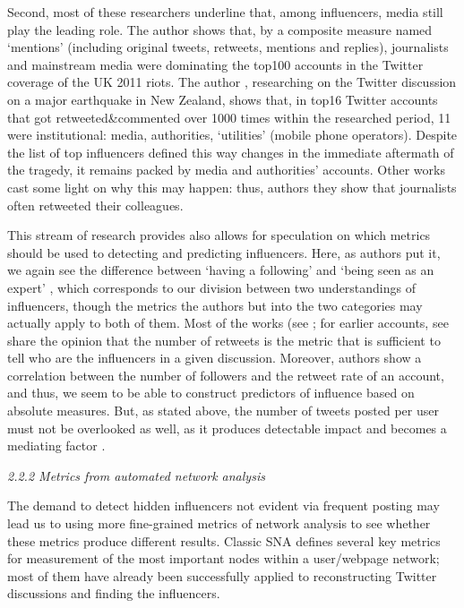 Second, most of these researchers underline that, among influencers, media still play the leading role. The author \cite{Vis} shows that, by a composite measure named ‘mentions’ (including original tweets, retweets, mentions and replies), journalists and mainstream media were dominating the top100 accounts in the Twitter coverage of the UK 2011 riots. The author \cite{Bruns}, researching on the Twitter discussion on a major earthquake in New Zealand, shows that, in top16 Twitter accounts that got retweeted\&commented over 1000 times within the researched period, 11 were institutional: media, authorities, ‘utilities’ (mobile phone operators). Despite the list of top influencers defined this way changes in the immediate aftermath of the tragedy, it remains packed by media and authorities’ accounts. Other works cast some light on why this may happen: thus, authors \cite{LotanGraeffAnanny} they show that journalists often retweeted their colleagues.

This stream of research provides also allows for speculation on which metrics should be used to detecting and predicting influencers. Here, as authors \cite{DuboisGaffney} put it, we again see the difference between ‘having a following’ and ‘being seen as an expert’ \cite[p.~1263]{DuboisGaffney}, which corresponds to our division between two understandings of influencers, though the metrics the authors but into the two categories may actually apply to both of them. Most of the works (see \cite{BastosRaimundoTravitzki}; for earlier accounts, see \cite{KwakLeePark,BoydGolderLotan,ChaHaddadiBenevenuto,MendozaPobleteCastillo,SuhHongChi} share the opinion that the number of retweets is the metric that is sufficient to tell who are the influencers in a given discussion. Moreover, authors \cite{SuhHongChi} show a correlation between the number of followers and the retweet rate of an account, and thus, we seem to be able to construct predictors of influence based on absolute measures. But, as stated above, the number of tweets posted per user must not be overlooked as well, as it produces detectable impact and becomes a mediating factor \cite{Jungherr}.

\textit{2.2.2 Metrics from automated network analysis}

The demand to detect hidden influencers not evident via frequent posting may lead us to using more fine-grained metrics of network analysis to see whether these metrics produce different results. Classic SNA defines several key metrics for measurement of the most important nodes within a user/webpage network; most of them have already been successfully applied to reconstructing Twitter discussions and finding the influencers.

